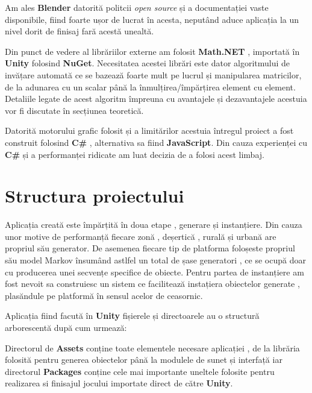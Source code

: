Am ales \textbf{Blender} datorită politcii \textit{open source} și a documentației vaste disponibile, fiind foarte ușor de lucrat în acesta, neputând aduce aplicația la un nivel dorit de finisaj fară acestă unealtă.\par

Din punct de vedere al librăriilor externe am folosit \textbf{Math.NET} , importată în \textbf{Unity} folosind \textbf{NuGet}. Necesitatea acestei librări este dator algoritmului de invățare automată ce se bazează foarte mult pe lucrul și manipularea matricilor, de la adunarea cu un scalar până la înmulțirea/împărțirea element cu element. Detaliile legate de acest algoritm împreuna cu avantajele și dezavantajele acestuia vor fi discutate în secțiunea teoretică.\par

Datorită motorului grafic folosit și a limitărilor acestuia întregul proiect a fost construit folosind \textbf{C\#} , alternativa sa fiind \textbf{JavaScript}. Din cauza experienței cu \textbf{C\#} și a performanței ridicate am luat decizia de a folosi acest limbaj.\par


\section{Structura proiectului}

Aplicația creată este împărțită în doua etape , generare și instanțiere. Din cauza unor motive de performanță fiecare zonă  , deșertică , rurală și urbană are propriul său generator. De asemenea fiecare tip de platforma foloșeste propriul său model Markov însumând astlfel un total de șase generatori , ce se ocupă doar cu producerea unei secvențe specifice de obiecte. Pentru partea de instanțiere am fost nevoit sa construiesc un sistem ce facilitează instațiera obiectelor generate , plasăndule pe platformă în sensul acelor de ceasornic.\par

Aplicația fiind facută în \textbf{Unity} fișierele și directoarele au o structură arborescentă după cum urmează: \par

\par
\par
\par
Directorul de \textbf{Assets} conține toate elementele necesare aplicației , de la librăria folosită pentru generea obiectelor până la modulele de sunet și interfață iar directorul \textbf{Packages} conține cele mai importante uneltele folosite pentru realizarea si finisajul jocului importate direct de către \textbf{Unity}.\par

